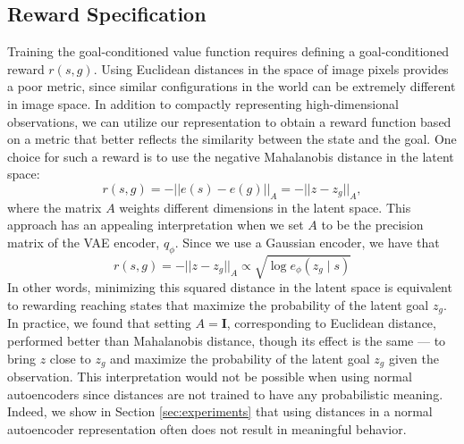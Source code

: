 \documentclass{article}
\begin{document}
\subsection{Reward Specification}\label{sec:reward-specification}
Training the goal-conditioned value function requires defining a goal-conditioned reward $r(s,g)$.
Using Euclidean distances in the space of image pixels provides a poor metric, since similar configurations in the world can be extremely different in image space.
In addition to compactly representing high-dimensional observations, we can utilize our representation to obtain a reward function based on a metric that better reflects the similarity between the state and the goal.
One choice for such a reward is to use the negative Mahalanobis distance in the latent space:
\begin{equation}\nonumber
    r(s, g) = -||e(s) - e(g)||_A = - ||z - z_g||_A,
\end{equation}
where the matrix $A$ weights different dimensions in the latent space.
This approach has an appealing interpretation when we set $A$ to be the precision matrix of the VAE encoder, $q_\phi$.
Since we use a Gaussian encoder, we have that
\begin{equation}\label{eq:reward-log-prob-equivalence}
    r(s, g) = - ||z - z_g||_A \propto \sqrt{\log e_\phi(z_g \mid s)}
\end{equation}
In other words, minimizing this squared distance in the latent space is equivalent to rewarding reaching states that maximize the probability of the latent goal $z_g$.
In practice, we found that setting $A = \mathbf{I}$, corresponding to Euclidean distance, performed better than Mahalanobis distance, though its effect is the same --- to bring $z$ close to $z_g$ and maximize the probability of the latent goal $z_g$ given the observation.
This interpretation would not be possible when using normal autoencoders since distances are not trained to have any probabilistic meaning.
Indeed, we show in Section \ref{sec:experiments} that using distances in a normal autoencoder representation often does not result in meaningful behavior.
\end{document}
